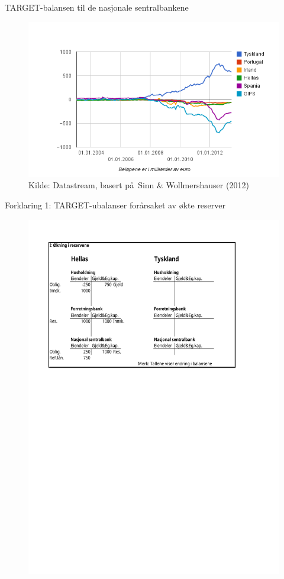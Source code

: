 \documentclass[notes=show notes]{beamer}
\begin{document}
\begin{frame}{TARGET-balansen til de nasjonale sentralbankene}
\begin{figure}
\centering
\includegraphics[width=0.9\linewidth]{Fig4_TARGET_gjeld_fordringer_G}
\center \small{Kilde: Datastream, basert p\aa \   Sinn \& Wollmershauser (2012)}
\label{fig:Fig4_TARGET_gjeld_fordringer_G}
\end{figure}
\end{frame}
\begin{frame}{Forklaring 1: TARGET-ubalanser for\aa rsaket av 
		\o kte reserver}
\begin{figure}
\centering
\includegraphics[width=0.9\linewidth]{Fork1_delI}
\label{fig:Fork1_dellI-1}
\end{figure}
\end{frame}
\end{document}
